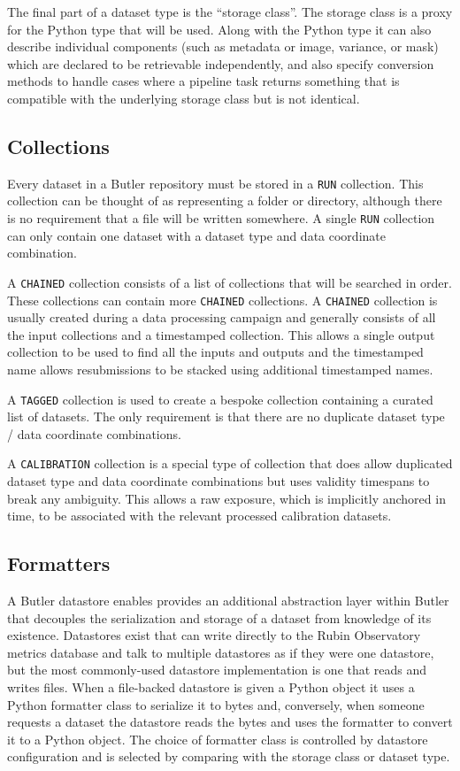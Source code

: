 The final part of a dataset type is the ``storage class''.
The storage class is a proxy for the Python type that will be used.
Along with the Python type it can also describe individual components (such as metadata or image, variance, or mask) which are declared to be retrievable independently, and also specify conversion methods to handle cases where a pipeline task returns something that is compatible with the underlying storage class but is not identical.

\subsection{Collections}

Every dataset in a Butler repository must be stored in a \texttt{RUN} collection.
This collection can be thought of as representing a folder or directory, although there is no requirement that a file will be written somewhere.
A single \texttt{RUN} collection can only contain one dataset with a dataset type and data coordinate combination.

A \texttt{CHAINED} collection consists of a list of collections that will be searched in order.
These collections can contain more \texttt{CHAINED} collections.
A \texttt{CHAINED} collection is usually created during a data processing campaign and generally consists of all the input collections and a timestamped collection.
This allows a single output collection to be used to find all the inputs and outputs and the timestamped name allows resubmissions to be stacked using additional timestamped names.

A \texttt{TAGGED} collection is used to create a bespoke collection containing a curated list of datasets.
The only requirement is that there are no duplicate dataset type / data coordinate combinations.

A \texttt{CALIBRATION} collection is a special type of collection that does allow duplicated dataset type and data coordinate combinations but uses validity timespans to break any ambiguity.
This allows a raw exposure, which is implicitly anchored in time, to be associated with the relevant processed calibration datasets.

\subsection{Formatters}

A Butler datastore enables provides an additional abstraction layer within Butler that decouples the serialization and storage of a dataset from knowledge of its existence.
Datastores exist that can write directly to the Rubin Observatory metrics database \cite{2024SPIE13101.59Ftmp} and talk to multiple datastores as if they were one datastore, but the most commonly-used datastore implementation is one that reads and writes files.
When a file-backed datastore is given a Python object it uses a Python formatter class to serialize it to bytes and, conversely, when someone requests a dataset the datastore reads the bytes and uses the formatter to convert it to a Python object.
The choice of formatter class is controlled by datastore configuration and is selected by comparing with the storage class or dataset type.

